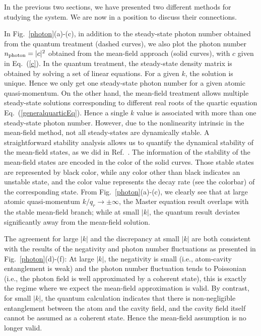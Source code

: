 \documentclass[atoms,article,submit,moreauthors,pdftex,12pt,a4paper]{mdpi}
\begin{document}
In the previous two sections, we have presented two different methods for studying the system. We are now in a position to discuss their connections. 

In Fig.~\ref{photon}(a)-(c), in addition to the steady-state photon number obtained from the quantum treatment (dashed curves), we also plot the photon number $n_{\rm photon}=|c|^2$ obtained from the mean-field approach (solid curves), with $c$ given in Eq.~(\ref{c}). In the quantum treatment, the steady-state density matrix is obtained by solving a set of linear equations. For a given $k$, the solution is unique. Hence we only get one steady-state photon number for a given atomic quasi-momentum. On the other hand, the mean-field treatment allows multiple steady-state solutions corresponding to different real roots of the quartic equation Eq.~(\ref{generalquarticEq}). Hence a single $k$ value is associated with more than one steady-state photon number. However, due to the nonlinearity intrinsic in the mean-field method, not all steady-states are dynamically stable. A straightforward stability analysis allows us to quantify the dynamical stability of the mean-field states, as we did in Ref.~\cite{cavitySOC}. The information of the stability of the mean-field states are encoded in the color of the solid curves. Those stable states are represented by black color, while any color other than black indicates an unstable state, and the color value represents the decay rate (see the colorbar) of the corresponding state. From Fig.~\ref{photon}(a)-(c), we clearly see that at large atomic quasi-momentum $k/q_r \longrightarrow  \pm \infty$, the Master equation result overlaps with the stable mean-field branch; while at small $|k|$, the quantum result deviates significantly away from the mean-field solution.

The agreement for large $|k|$ and the discrepancy at small $|k|$ are both consistent with the results of the negativity and photon number fluctuations as presented in Fig.~\ref{photon}(d)-(f): At large $|k|$, the negativity is small (i.e., atom-cavity entanglement is weak) and the photon number fluctuation tends to Poissonian (i.e., the photon field is well approximated by a coherent state), this is exactly the regime where we expect the mean-field approximation is valid. By contrast, for small $|k|$, the quantum calculation indicates that there is non-negligible entanglement between the atom and the cavity field, and the cavity field itself cannot be assumed as a coherent state. Hence the mean-field assumption is no longer valid.
\end{document}
